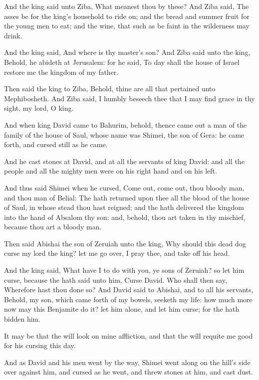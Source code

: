 \verse And the king said unto Ziba, What meanest thou by these? And Ziba said, The asses be for the king's household to ride on; and the bread and summer fruit for the young men to eat; and the wine, that such as be faint in the wilderness may drink.

\verse And the king said, And where is thy master's son? And Ziba said unto the king, Behold, he abideth at Jerusalem: for he said, To day shall the house of Israel restore me the kingdom of my father.

\verse Then said the king to Ziba, Behold, thine are all that pertained unto Mephibosheth. And Ziba said, I humbly beseech thee that I may find grace in thy sight, my lord, O king.

\verse And when king David came to Bahurim, behold, thence came out a man of the family of the house of Saul, whose name was Shimei, the son of Gera: he came forth, and cursed still as he came.

\verse And he cast stones at David, and at all the servants of king David: and all the people and all the mighty men were on his right hand and on his left.

\verse And thus said Shimei when he cursed, Come out, come out, thou bloody man, and thou man of Belial: \verse The \LORD hath returned upon thee all the blood of the house of Saul, in whose stead thou hast reigned; and the \LORD hath delivered the kingdom into the hand of Absalom thy son: and, behold, thou art taken in thy mischief, because thou art a bloody man.

\verse Then said Abishai the son of Zeruiah unto the king, Why should this dead dog curse my lord the king? let me go over, I pray thee, and take off his head.

\verse And the king said, What have I to do with you, ye sons of Zeruiah?  so let him curse, because the \LORD hath said unto him, Curse David. Who shall then say, Wherefore hast thou done so?  \verse And David said to Abishai, and to all his servants, Behold, my son, which came forth of my bowels, seeketh my life: how much more now may this Benjamite do it? let him alone, and let him curse; for the \LORD hath bidden him.

\verse It may be that the \LORD will look on mine affliction, and that the \LORD will requite me good for his cursing this day.

\verse And as David and his men went by the way, Shimei went along on the hill's side over against him, and cursed as he went, and threw stones at him, and cast dust.

